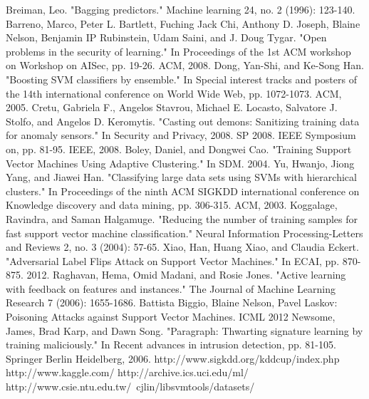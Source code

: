 \documentclass[10pt,conference,compsocconf,letterpaper]{IEEEtran}
\begin{document}
\begin{thebibliography}{9}

Breiman, Leo. "Bagging predictors." Machine learning 24, no. 2 (1996): 123-140.
Barreno, Marco, Peter L. Bartlett, Fuching Jack Chi, Anthony D. Joseph, Blaine Nelson, Benjamin IP Rubinstein, Udam Saini, and J. Doug Tygar. "Open problems in the security of learning." In Proceedings of the 1st ACM workshop on Workshop on AISec, pp. 19-26. ACM, 2008.
Dong, Yan-Shi, and Ke-Song Han. "Boosting SVM classifiers by ensemble." In Special interest tracks and posters of the 14th international conference on World Wide Web, pp. 1072-1073. ACM, 2005.
Cretu, Gabriela F., Angelos Stavrou, Michael E. Locasto, Salvatore J. Stolfo, and Angelos D. Keromytis. "Casting out demons: Sanitizing training data for anomaly sensors." In Security and Privacy, 2008. SP 2008. IEEE Symposium on, pp. 81-95. IEEE, 2008.
Boley, Daniel, and Dongwei Cao. "Training Support Vector Machines Using Adaptive Clustering." In SDM. 2004.
Yu, Hwanjo, Jiong Yang, and Jiawei Han. "Classifying large data sets using SVMs with hierarchical clusters." In Proceedings of the ninth ACM SIGKDD international conference on Knowledge discovery and data mining, pp. 306-315. ACM, 2003.
Koggalage, Ravindra, and Saman Halgamuge. "Reducing the number of training samples for fast support vector machine classification." Neural Information Processing-Letters and Reviews 2, no. 3 (2004): 57-65.
Xiao, Han, Huang Xiao, and Claudia Eckert. "Adversarial Label Flips Attack on Support Vector Machines." In ECAI, pp. 870-875. 2012.
Raghavan, Hema, Omid Madani, and Rosie Jones. "Active learning with feedback on features and instances." The Journal of Machine Learning Research 7 (2006): 1655-1686.
Battista Biggio, Blaine Nelson, Pavel Laskov: Poisoning Attacks against Support Vector Machines. ICML 2012
Newsome, James, Brad Karp, and Dawn Song. "Paragraph: Thwarting signature learning by training maliciously." In Recent advances in intrusion detection, pp. 81-105. Springer Berlin Heidelberg, 2006.
http://www.sigkdd.org/kddcup/index.php
http://www.kaggle.com/
http://archive.ics.uci.edu/ml/
http://www.csie.ntu.edu.tw/~cjlin/libsvmtools/datasets/
\end{thebibliography}
\end{document}
